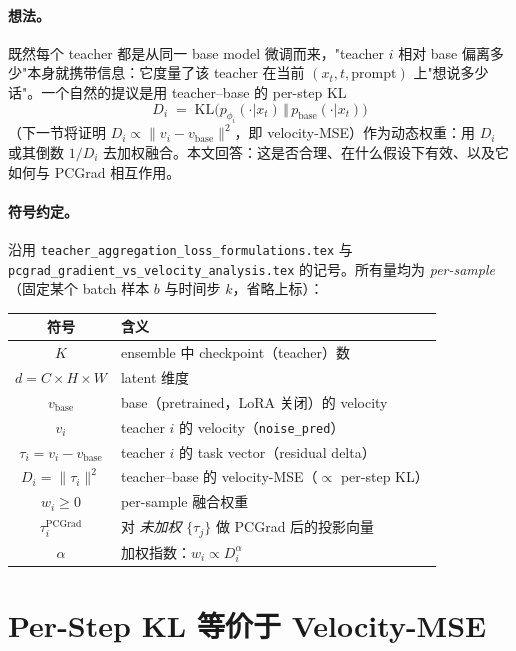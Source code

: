 \documentclass[11pt,a4paper]{article}
\newcommand{\KL}{\mathrm{KL}}
\newcommand{\PC}{\mathrm{PCGrad}}
\newcommand{\vb}{v_{\mathrm{base}}}
\newcommand{\norm}[1]{\lVert #1\rVert}
\theoremstyle{plain}
\theoremstyle{definition}
\begin{document}
\paragraph{想法。} 既然每个 teacher 都是从同一 base model 微调而来，"teacher $i$ 相对 base 偏离多少"本身就携带信息：它度量了该 teacher 在当前 $(x_t,t,\text{prompt})$ 上"想说多少话"。一个自然的提议是用 teacher--base 的 per-step KL
\[
D_i \;=\; \KL\bigl(p_{\phi_i}(\cdot|x_t)\,\Vert\,p_{\mathrm{base}}(\cdot|x_t)\bigr)
\]
（下一节将证明 $D_i\propto\norm{v_i-\vb}^2$，即 velocity-MSE）作为动态权重：用 $D_i$ 或其倒数 $1/D_i$ 去加权融合。本文回答：这是否合理、在什么假设下有效、以及它如何与 PCGrad 相互作用。

\paragraph{符号约定。} 沿用 \texttt{teacher\_aggregation\_loss\_formulations.tex} 与 \texttt{pcgrad\_gradient\_vs\_velocity\_analysis.tex} 的记号。所有量均为 \emph{per-sample}（固定某个 batch 样本 $b$ 与时间步 $k$，省略上标）：
\begin{center}
\begin{tabular}{cl}
\toprule
\textbf{符号} & \textbf{含义} \\
\midrule
$K$ & ensemble 中 checkpoint（teacher）数 \\
$d=C\times H\times W$ & latent 维度 \\
$\vb$ & base（pretrained，LoRA 关闭）的 velocity \\
$v_i$ & teacher $i$ 的 velocity（\texttt{noise\_pred}） \\
$\tau_i = v_i-\vb$ & teacher $i$ 的 task vector（residual delta） \\
$D_i=\norm{\tau_i}^2$ & teacher--base 的 velocity-MSE（$\propto$ per-step KL） \\
$w_i\ge 0$ & per-sample 融合权重 \\
$\tau_i^{\PC}$ & 对 \emph{未加权} $\{\tau_j\}$ 做 PCGrad 后的投影向量 \\
$\alpha$ & 加权指数：$w_i\propto D_i^{\alpha}$ \\
\bottomrule
\end{tabular}
\end{center}

\section{Per-Step KL 等价于 Velocity-MSE}
\end{document}

